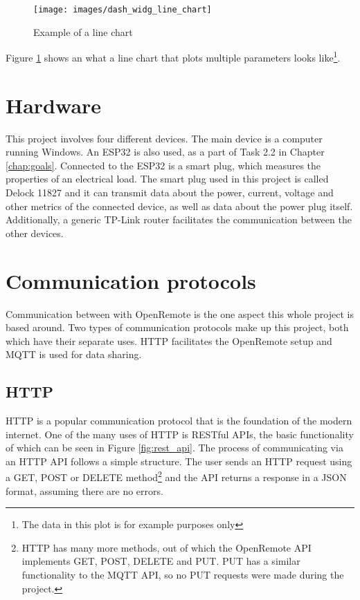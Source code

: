 \begin{figure}[th]
	\centering
	\texttt{[image: images/dash\_widg\_line\_chart]}
	\caption{Example of a line chart}
	\label{fig:dashwidglinechart}
\end{figure}

Figure \ref{fig:dashwidglinechart} shows an what a line chart that plots multiple parameters looks like\footnote{The data in this plot is for example purposes only}.

\section{Hardware}
This project involves four different devices. The main device is a computer running Windows. An ESP32 is also used, as a part of Task 2.2 in Chapter \ref{chap:goals}. Connected to the ESP32 is a smart plug, which measures the properties of an electrical load. The smart plug used in this project is called Delock 11827 and it can transmit data about the power, current, voltage and other metrics of the connected device, as well as data about the power plug itself. Additionally, a generic TP-Link router facilitates the communication between the other devices.


\section{Communication protocols}
Communication between with OpenRemote is the one aspect this whole project is based around. Two types of communication protocols make up this project, both which have their separate uses. HTTP facilitates the OpenRemote setup and MQTT is used for data sharing.
\subsection{HTTP}
HTTP \cite{rfc9113} is a popular communication protocol that is the foundation of the modern internet. One of the many uses of HTTP is RESTful APIs, the basic functionality of which can be seen in Figure \ref{fig:rest_api}. The process of communicating via an HTTP API follows a simple structure. The user sends an HTTP request using a GET, POST or DELETE method\footnote{HTTP has many more methods, out of which the OpenRemote API implements GET, POST, DELETE and PUT. PUT has a similar functionality to the MQTT API, so no PUT requests were made during the project.} and the API returns a response in a JSON format, assuming there are no errors.

